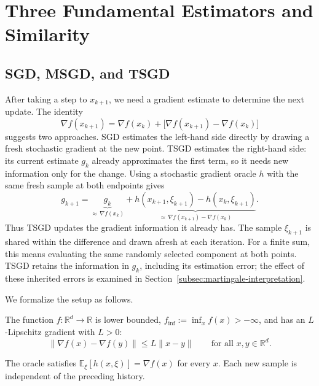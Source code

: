 \section{Three Fundamental Estimators and Similarity}
\label{sec:algorithms-and-errors}

\subsection{SGD, MSGD, and TSGD}
\label{subsec:algorithms-and-assumptions}

After taking a step to $x_{k+1}$, we need a gradient estimate to
determine the next update. The identity
\[
\nabla f(x_{k+1})
=\nabla f(x_k)+\bigl[\nabla f(x_{k+1})-\nabla f(x_k)\bigr]
\]
suggests two approaches. SGD estimates the left-hand side directly
by drawing a fresh stochastic gradient at the new point. TSGD estimates
the right-hand side: its current estimate $g_k$ already approximates
the first term, so it needs new information only for the change.
Using a stochastic gradient oracle $h$ with the same fresh sample
at both endpoints gives
\[
g_{k+1}
=\underbrace{g_k}_{\approx\,\nabla f(x_k)}
+\underbrace{h(x_{k+1},\xi_{k+1})-h(x_k,\xi_{k+1})}
 _{\approx\,\nabla f(x_{k+1})-\nabla f(x_k)}.
\]
Thus TSGD updates the gradient information it already has.
The sample $\xi_{k+1}$ is shared within the difference and drawn afresh
at each iteration. For a finite sum, this means evaluating the same
randomly selected component at both points. TSGD retains the information
in $g_k$, including its estimation error; the effect of these inherited
errors is examined in Section~\ref{subsec:martingale-interpretation}.

We formalize the setup as follows.
\begin{assumption}
\label{ass:smooth-objective}
The function $f:\mathbb R^d\to\mathbb R$ is lower bounded,
$f_{\inf}:=\inf_x f(x)>-\infty$, and has an $L$-Lipschitz gradient
with $L>0$:
\[
\|\nabla f(x)-\nabla f(y)\|\leq L\|x-y\|
\qquad\text{for all }x,y\in\mathbb R^d.
\]
\end{assumption}
\begin{assumption}
\label{ass:unbiased-oracle}
The oracle satisfies $\mathbb E_{\xi}[h(x,\xi)]=\nabla f(x)$ for every $x$.
Each new sample is independent of the preceding history.
\end{assumption}

